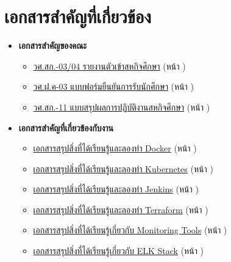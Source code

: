 \chapter{เอกสารสำคัญที่เกี่ยวข้อง}
\begin{itemize}
    \item \textbf{เอกสารสำคัญของคณะ}
          \begin{itemize}
              \item \hyperlink{target:03-04}{วศ.สก.-03/04 รายงานตัวเข้าสหกิจศึกษา} (หน้า \pageref{page:03-04})
              \item \hyperlink{target:03}{วศ.ฝ.ค-03 แบบฟอร์มยืนยันการรับนักศึกษา} (หน้า \pageref{page:03})
              \item \hyperlink{target:11}{วศ.สก.-11 แบบสรุปผลการปฏิบัติงานสหกิจศึกษา} (หน้า \pageref{page:11})
          \end{itemize}
    \item \textbf{เอกสารสำคัญที่เกี่ยวข้องกับงาน}
          \begin{itemize}
              \item \hyperlink{target:docker}{เอกสารสรุปสิ่งที่ได้เรียนรู้และลองทำ Docker} (หน้า \pageref{page:docker})
              \item \hyperlink{target:kube}{เอกสารสรุปสิ่งที่ได้เรียนรู้และลองทำ Kubernetes} (หน้า \pageref{page:kube})
              \item \hyperlink{target:jenkins}{เอกสารสรุปสิ่งที่ได้เรียนรู้และลองทำ Jenkins} (หน้า \pageref{page:jenkins})
              \item \hyperlink{target:terraform}{เอกสารสรุปสิ่งที่ได้เรียนรู้และลองทำ Terraform} (หน้า \pageref{page:terraform})
              \item \hyperlink{target:monitoring}{เอกสารสรุปสิ่งที่ได้เรียนรู้เกี่ยวกับ Monitoring Tools} (หน้า \pageref{page:monitoring})
              \item \hyperlink{target:elk}{เอกสารสรุปสิ่งที่ได้เรียนรู้เกี่ยวกับ ELK Stack} (หน้า \pageref{page:elk})
          \end{itemize}
\end{itemize}





